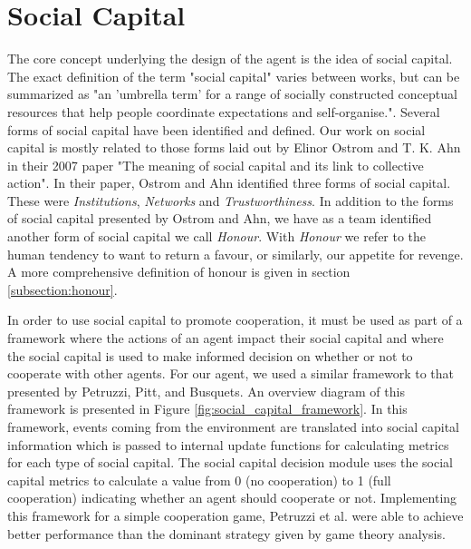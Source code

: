 \section{Social Capital}

The core concept underlying the design of the agent is the idea of social capital. The exact definition of the term "social capital" varies between works, but can be summarized as "an 'umbrella term' for a range of socially constructed conceptual resources that help people coordinate expectations and self-organise."\cite{pitt}. Several forms of social capital have been identified and defined. Our work on social capital is mostly related to those forms laid out by Elinor Ostrom and T. K. Ahn in their 2007 paper "The meaning of social capital and its link to collective action". \cite{ostrom-ahn} In their paper, Ostrom and Ahn identified three forms of social capital. These were \emph{Institutions}, \emph{Networks} and \emph{Trustworthiness}. In addition to the forms of social capital presented by Ostrom and Ahn, we have as a team identified another form of social capital we call \emph{Honour}. With \emph{Honour} we refer to the human tendency to want to return a favour, or similarly, our appetite for revenge. A more comprehensive definition of honour is given in section \ref{subsection:honour}. 

In order to use social capital to promote cooperation, it must be used as part of a framework where the actions of an agent impact their social capital and where the social capital is used to make informed decision on whether or not to cooperate with other agents. For our agent, we used a similar framework to that presented by Petruzzi, Pitt, and Busquets\cite{complexity_reduction}. An overview diagram of this framework is presented in Figure \ref{fig:social_capital_framework}. In this framework, events coming from the environment are translated into social capital information which is passed to internal update functions for calculating metrics for each type of social capital. The social capital decision module uses the social capital metrics to calculate a value from 0 (no cooperation) to 1 (full cooperation) indicating whether an agent should cooperate or not. Implementing this framework for a simple cooperation game, Petruzzi et al. were able to achieve better performance than the dominant strategy given by game theory analysis. 

